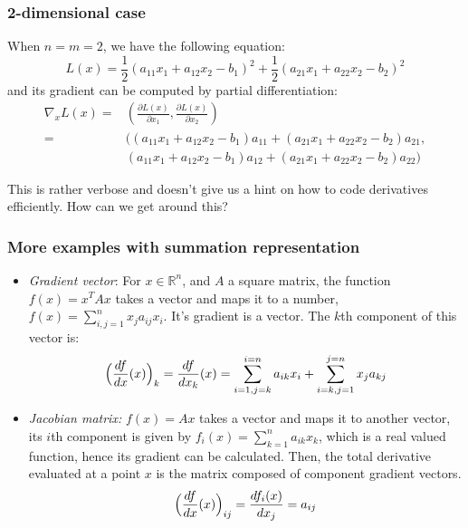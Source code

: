 \documentclass{beamer}
\begin{document}
\begin{frame}
\frametitle{2-dimensional case}

When $n=m=2$, we have the following equation: \[L(x) = \frac{1}{2}(a_{11}x_1 + a_{12}x_2 -b_1)^2+\frac{1}{2}(a_{21}x_1 + a_{22}x_2 - b_2)^2\] and its gradient can be computed by partial differentiation: 
\begin{align*}
    \nabla_xL(x) = &(\frac{\partial L(x)}{\partial x_1}, \frac{\partial L(x)}{\partial x_2}) \\
    = &((a_{11}x_1 + a_{12}x_2 -b_1)a_{11} + (a_{21}x_1 + a_{22}x_2 - b_2)a_{21}, \\
    &(a_{11}x_1 + a_{12}x_2 -b_1)a_{12} + (a_{21}x_1 + a_{22}x_2 - b_2)a_{22})
\end{align*}

This is rather verbose and doesn't give us a hint on how to code derivatives efficiently.
How can we get around this?

\end{frame}


\begin{frame}
\frametitle{More examples with summation representation}

\begin{itemize}
    \item \textit{Gradient vector}: For $x\in \mathbb{R}^n$, and $A$ a square matrix, the function $f(x)=x^TAx$ takes a vector and maps it to a number, $f(x) = \sum_{i,j=1}^nx_ja_{ij}x_i$. It's gradient is a vector. The $k$th component of this vector is:\[ \Big{(}\frac{df}{dx}(x) \Big{)}_k = \frac{df}{dx_k}(x) = \sum_{i=1, j=k}^{i=n}a_{ik}x_i + \sum_{i=k, j=1}^{j=n}x_ja_{kj} \] 
    \item \textit{Jacobian matrix:} $f(x)=Ax$ takes a vector and maps it to another vector, its $i$th component is given by $f_i(x) = \sum_{k=1}^na_{ik}x_k $, which is a real valued function, hence its gradient can be calculated. Then, the total derivative evaluated at a point $x$ is the matrix composed of component gradient vectors. \[ \Big{(}\frac{df}{dx}(x)\Big{)}_{ij} = \frac{df_i(x)}{dx_j} = a_{ij} \]
\end{itemize}

\end{frame}

\end{document}
